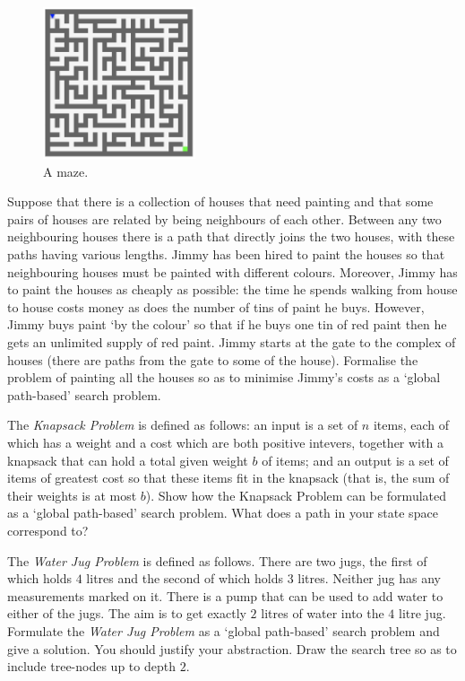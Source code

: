 \begin{figure}
    \centering
    \includegraphics[width = 0.4\textwidth]{images/maze.png}
    \caption{A maze.}
    \label{fig:maze}
\end{figure}

\question Suppose that there is a collection of houses that need painting and that some pairs of houses are related by being neighbours of each other.
Between any two neighbouring houses there is a path that directly joins the two houses, with these paths having various lengths.
Jimmy has been hired to paint the houses so that neighbouring houses must be painted with different colours.
Moreover, Jimmy has to paint the houses as cheaply as possible: the time he spends walking from house to house costs money as does the number of tins of paint he buys.
However, Jimmy buys paint `by the colour' so that if he buys one tin of red paint then he gets an unlimited supply of red paint.
Jimmy starts at the gate to the complex of houses (there are paths from the gate to some of the house). 
Formalise the problem of painting all the houses so as to minimise Jimmy's costs as a `global path-based' search problem. 

\question The \emph{Knapsack Problem} is defined as follows: an input is a set of $n$ items, each of which has a weight and a cost which are both positive intevers, 
together with a knapsack that can hold a total given weight $b$ of items;
and an output is a set of items of greatest cost so that these items fit in the knapsack 
(that is, the sum of their weights is at most $b$). 
Show how the Knapsack Problem can be formulated as a `global path-based' search problem.
What does a path in your state space correspond to?

\question The \emph{Water Jug Problem} is defined as follows.
There are two jugs, the first of which holds $4$ litres and the second of which holds $3$ litres.
Neither jug has any measurements marked on it.
There is a pump that can be used to add water to either of the jugs.
The aim is to get exactly $2$ litres of water into the $4$ litre jug.
Formulate the \emph{Water Jug Problem} as a `global path-based' search problem and give a solution.
You should justify your abstraction.
Draw the search tree so as to include tree-nodes up to depth $2$.

